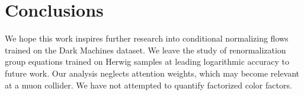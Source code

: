 \section{Conclusions}\label{sec:conclusions}

We hope this work inspires further research into conditional normalizing
flows trained on the Dark Machines dataset. We leave the study of
renormalization group equations trained on Herwig samples at leading
logarithmic accuracy to future work. Our analysis neglects attention
weights, which may become relevant at a muon collider. We have not
attempted to quantify factorized color factors.


